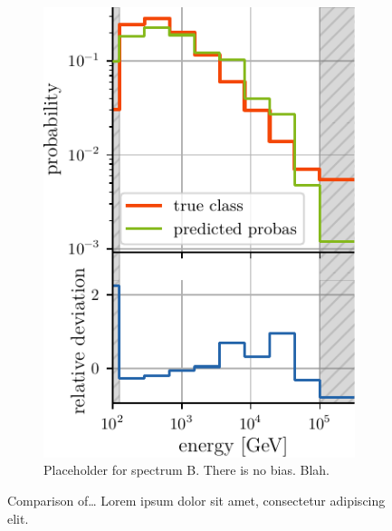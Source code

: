 \begin{figure}[H]
\begin{subfigure}{0.45\textwidth}
        \includegraphics[width=\textwidth]{content/plots/bootstrap:spectrum_halfwidth.pdf}
        \caption{
            Placeholder for spectrum B.
            There is no bias. Blah.
        }
    \end{subfigure}
    \caption{
        Comparison of…
        Lorem ipsum dolor sit amet, consectetur adipiscing elit.
    }
    \label{fig:bias_comparison}
\end{figure}
